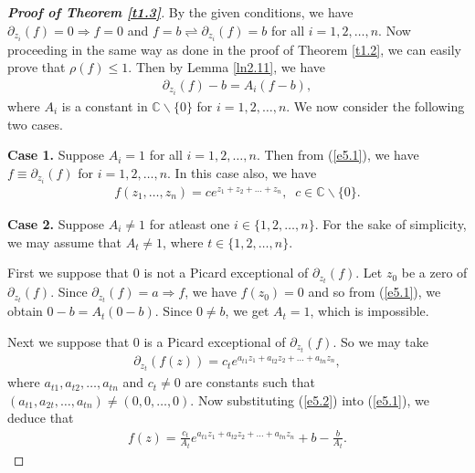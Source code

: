 \documentclass[11pt, reqno]{amsart}
\newtheorem*{cor A}{Corollary A}
\newtheorem*{cor B}{Corollary B}
\numberwithin{equation}{section}
\begin{document}
\begin{proof}[{\bf Proof of Theorem \ref{t1.3}}] 
By the given conditions, we have $\partial_{z_i}(f)=0\Rightarrow f=0$ and $f=b\rightleftharpoons \partial_{z_i}(f)=b$ for all $i=1,2,\ldots,n$. Now proceeding in the same way as done in the proof of Theorem \ref{t1.2}, we can easily prove that $\rho(f)\leq 1$.
Then by Lemma \ref{ln2.11}, we have
\begin{align}\label{e5.1}
\partial_{z_i}(f)-b=A_i(f-b),
\end{align}
where $A_i$ is a constant in $\mathbb{C}\backslash \{0\}$ for $i=1,2,\ldots,n$.
We now consider the following two cases.

\smallskip
{\bf Case 1.} Suppose $A_i=1$ for all $i=1,2,\ldots,n$. Then from (\ref{e5.1}), we have $f\equiv \partial_{z_i}(f)$ for $i=1,2,\ldots,n$.
In this case also, we have
\begin{align*}
f(z_1,\ldots,z_n)=ce^{z_1+z_2+\ldots+z_n},\;\;c\in\mathbb{C}\backslash \{0\}.
\end{align*}

\smallskip
{\bf Case 2.} Suppose $A_i\neq 1$ for atleast one $i\in\{1,2,\ldots,n\}$. For the sake of simplicity, we may assume that $A_t\neq 1$, where $t\in\{1,2,\ldots,n\}$.

First we suppose that $0$ is not a Picard exceptional of $\partial_{z_t}(f)$. Let $z_0$ be a zero of $\partial_{z_t}(f)$. Since $\partial_{z_t}(f)=a\Rightarrow f$, we have $f(z_0)=0$ and so from (\ref{e5.1}), we obtain $0-b=A_t(0-b)$. Since $0\neq b$, we get $A_t=1$, which is impossible.
 
\smallskip
Next we suppose that $0$ is a Picard exceptional of $\partial_{z_t}(f)$.
So we may take 
\begin{align}\label{e5.2}
\partial_{z_t}(f(z))=c_te^{a_{t1}z_1+a_{t2}z_2+\ldots+a_{tn}z_n},
\end{align} 
where $a_{t1},a_{t2},\ldots,a_{tn}$ and $c_t\neq 0$ are constants such that $(a_{t1},a_{2t},\ldots,a_{tn})\neq (0,0,\ldots,0)$. Now substituting (\ref{e5.2}) into (\ref{e5.1}), we deduce that
\begin{align}\label{e5.3}
f(z)=\frac{c_t}{A_t}e^{a_{t1}z_1+a_{t2}z_2+\ldots+a_{tn}z_n}+b-\frac{b}{A_t}.
\end{align}


\end{proof}
\end{document}
